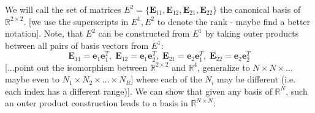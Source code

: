 We will call the set of matrices $E^2 = \{\mathbf{E}_{11}, \mathbf{E}_{12}, \mathbf{E}_{21}, \mathbf{E}_{22}\}$ the canonical basis of $\mathbb{R}^{2 \times 2}$. [we use the superscripts in $E^1, E^2$ to denote the rank - maybe find a better notation]. Note, that $E^2$ can be constructed from $E^1$ by taking outer products between all pairs of basis vectors from $E^1$: 
\begin{equation}
 \mathbf{E}_{11} = \mathbf{e}_1 \mathbf{e}_1^T, \;
 \mathbf{E}_{12} = \mathbf{e}_1 \mathbf{e}_2^T, \;
 \mathbf{E}_{21} = \mathbf{e}_2 \mathbf{e}_1^T, \;
 \mathbf{E}_{22} = \mathbf{e}_2 \mathbf{e}_2^T
\end{equation}
[...point out the isomorphism between $\mathbb{R}^{2 \times 2}$ and $\mathbb{R}^4$, generalize to $N \times N \times \ldots$ maybe even to $N_1 \times N_2 \times \ldots \times N_R$] where each of the $N_i$ may be different (i.e. each index has a different range)]. We can show that given any basis of $\mathbb{R}^N$, such an outer product construction leads to a basis in $\mathbb{R}^{N \times N}$:

